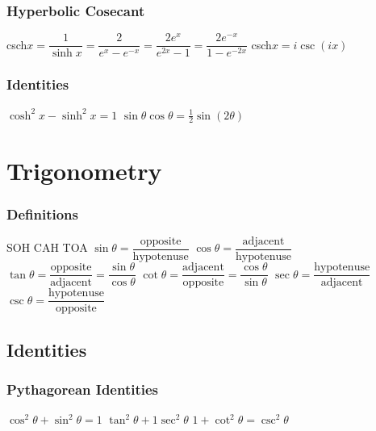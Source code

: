 \subsubsection{Hyperbolic Cosecant}	
\begin{itemize}
\itemt csch\(x = \dfrac{1}{\sinh x} = \dfrac{2}{e^x - e^{-x}} = \dfrac{2e^x}{e^{2x}-1} = \dfrac{2e^{-x}}{1-e^{-2x}} \)
\itemt csch\(x = i\csc(ix) \)
\end{itemize}				

\subsubsection{Identities}			
\begin{itemize}
\itemt \( \cosh^2x - \sinh^2x = 1 \)
\itemt \( \sin\theta \cos\theta = \frac{1}{2}\sin(2\theta) \)
\end{itemize}
			

	\section{Trigonometry}


\subsubsection{Definitions}
\begin{itemize}
\itemt SOH CAH TOA
\itemt \( \sin\theta = \dfrac{\mathrm{opposite}}{\mathrm{hypotenuse}} \)
\itemt \( \cos\theta = \dfrac{\mathrm{adjacent}}{\mathrm{hypotenuse}} \)
\itemt \( \tan\theta = \dfrac{\mathrm{opposite}}{\mathrm{adjacent}} = \dfrac{\sin\theta}{\cos\theta} \)
\itemt \( \cot\theta = \dfrac{\mathrm{adjacent}}{\mathrm{opposite}} = \dfrac{\cos\theta}{\sin\theta} \)
\itemt \( \sec\theta = \dfrac{\mathrm{hypotenuse}}{\mathrm{adjacent}} \)
\itemt \( \csc\theta = \dfrac{\mathrm{hypotenuse}}{\mathrm{opposite}} \)
\end{itemize}

\subsection{Identities}

\subsubsection{Pythagorean Identities}
\begin{itemize}
\itemt \( \cos^2\theta+\sin^2\theta = 1 \)
\itemt \( \tan^2\theta + 1 \sec^2 \theta \)
\itemt \( 1 + \cot^2 \theta = \csc^2 \theta \)

\end{itemize}

